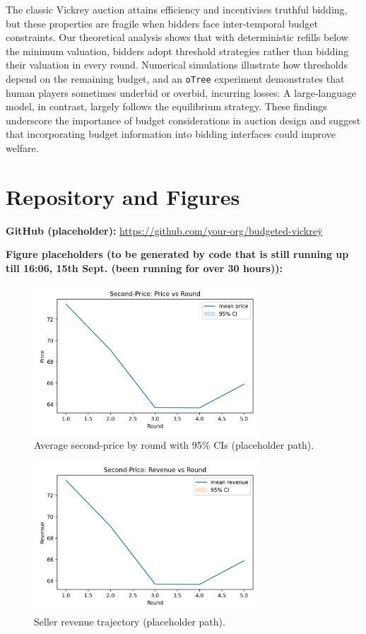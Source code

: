 The classic Vickrey auction attains efficiency and incentivises truthful bidding, but these properties are fragile when bidders face inter‑temporal budget constraints.  Our theoretical analysis shows that with deterministic refills below the minimum valuation, bidders adopt threshold strategies rather than bidding their valuation in every round.  Numerical simulations illustrate how thresholds depend on the remaining budget, and an \texttt{oTree} experiment demonstrates that human players sometimes underbid or overbid, incurring losses.  A large‑language model, in contrast, largely follows the equilibrium strategy.  These findings underscore the importance of budget considerations in auction design and suggest that incorporating budget information into bidding interfaces could improve welfare.


\section*{Repository and Figures}
\noindent\textbf{GitHub (placeholder):} \href{https://github.com/your-org/budgeted-vickrey}{https://github.com/your-org/budgeted-vickrey}\.\par\smallskip
\noindent\textbf{Figure placeholders (to be generated by code that is still running up till 16:06, 15th Sept. (been running for over 30 hours)):}
\begin{figure}[H]
  \centering
  \includegraphics[width=0.75\textwidth]{figures/price_path.png}
  \caption{Average second-price by round with 95\% CIs (placeholder path).}
  \label{fig:price_path}
\end{figure}
\begin{figure}[H]
  \centering
  \includegraphics[width=0.75\textwidth]{figures/revenue_by_round.png}
  \caption{Seller revenue trajectory (placeholder path).}
  \label{fig:revenue_by_round}
\end{figure}
